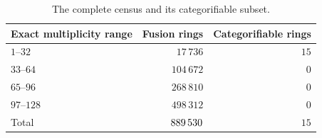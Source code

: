 \begin{table}[ht]
\centering
\begin{tabular}{lrr}
\toprule
Exact multiplicity range & Fusion rings & Categorifiable rings\\
\midrule
$1$--$32$ & $17\,736$ & $15$\\
$33$--$64$ & $104\,672$ & $0$\\
$65$--$96$ & $268\,810$ & $0$\\
$97$--$128$ & $498\,312$ & $0$\\
\midrule
Total & $889\,530$ & $15$\\
\bottomrule
\end{tabular}
\caption{The complete census and its categorifiable subset.}
\label{tab:census-bands}
\end{table}
